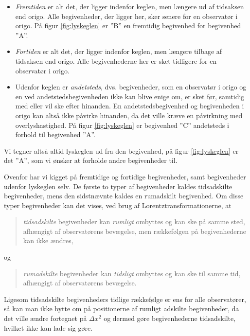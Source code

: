 \begin{itemize}
    \item \emph{Fremtiden} er alt det, der ligger indenfor keglen, men længere ud af tidsaksen end origo. Alle begivenheder, der ligger her, sker senere for en observatør i origo. På figur \ref{fig:lyskeglen} er ''B'' en fremtidig begivenhed for begivenhed ''A''.
    \item \emph{Fortiden} er alt det, der ligger indenfor keglen, men længere tilbage af tidsaksen end origo. Alle begivenhederne her er sket tidligere for en observatør i origo.
    \item Udenfor keglen er \emph{andetsteds}, dvs. begivenheder, som en observatør i origo og en ved andetstedsbegivenheden ikke kan blive enige om, er sket før, samtidig med eller vil ske efter hinanden. En andetstedsbegivenhed og begivenheden i origo kan altså ikke påvirke hinanden, da det ville kræve en påvirkning med overlyshastighed. På figur \ref{fig:lyskeglen} er begivenhed ''C'' andetsteds i forhold til begivenhed ''A''.
\end{itemize}
Vi tegner altså altid lyskeglen ud fra den begivenhed, på figur \ref{fig:lyskeglen} er det ''A'', som vi ønsker at forholde andre begivenheder til.

Ovenfor har vi kigget på fremtidige og fortidige begivenheder, samt begivenheder udenfor lyskeglen selv. De første to typer af begivenheder kaldes tidsadskilte begivenheder, mens den sidstnævnte kaldes en rumadskilt begivenhed. Om disse typer begivenheder kan det vises, ved brug af Lorentztransformationerne, at
\begin{quote}
    \emph{tidsadskilte} begivenheder kan \emph{rumligt} ombyttes og kan ske på samme sted, afhængigt af observatørens bevægelse, men rækkefølgen på begivenhederne kan ikke ændres,
\end{quote}
og
\begin{quote}
    \emph{rumadskilte} begivenheder kan \emph{tidsligt} ombyttes og kan ske til samme tid, afhængigt af observatørens bevægelse.
\end{quote}
Ligesom tidsadskilte begivenheders tidlige rækkefølge er ens for alle observatører, så kan man ikke bytte om på positionerne af rumligt adskilte begivenheder, da det ville ændre fortegnet på $\Delta x^2$ og dermed gøre begivenhederne tidsadskilte, hvilket ikke kan lade sig gøre. \\

